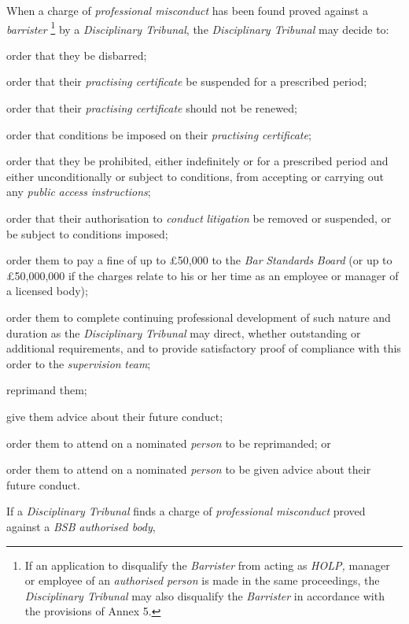 When a charge of \emph{professional misconduct} has been found proved
against a \emph{barrister }\footnote{If an application to disqualify the \emph{Barrister }from acting
as \emph{HOLP, }manager or employee of an \emph{authorised person }is
made in the same proceedings, the \emph{Disciplinary Tribunal }may also
disqualify the \emph{Barrister }in accordance with the provisions of
Annex 5.} by a \emph{Disciplinary Tribunal},
the \emph{Disciplinary Tribunal} may decide to:\\\nl \item order that they be disbarred;\item order that their \emph{practising certificate }be suspended for a
prescribed period;\item order that their \emph{practising certificate} should not be
renewed;\item order that conditions be imposed on their \emph{practising
certificate};\item order that they be prohibited, either indefinitely or for a
prescribed period and either unconditionally or subject to conditions,
from accepting or carrying out
any \emph{public} \emph{access} \emph{instructions};\item order that their authorisation to \emph{conduct} \emph{litigation} be
removed or suspended, or be subject to conditions imposed;\item order them to pay a fine of up to £50,000 to
the \emph{Bar} \emph{Standards} \emph{Board} (or up to £50,000,000 if
the charges relate to his or her time as an employee or manager of a
licensed body);\item order them to complete continuing professional development of such
nature and duration as the \emph{Disciplinary} \emph{Tribunal} may
direct, whether outstanding or additional requirements, and to provide
satisfactory proof of compliance with this order to
the \emph{supervision} \emph{team};\item reprimand them;\item give them advice about their future conduct;\item order them to attend on a nominated \emph{person} to be reprimanded;
or\item order them to attend on a nominated \emph{person} to be given advice
about their future conduct.\ln
{}\par
If a \emph{Disciplinary Tribunal} finds a charge of \emph{professional
misconduct} proved against a \emph{BSB} \emph{authorised body},
